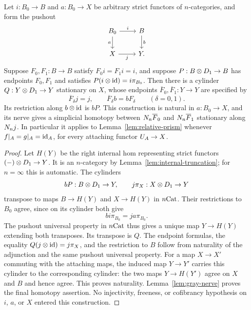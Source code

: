 \begin{lemma}\label{lem:pushout-cylinder}
Let $i:B_0\to B$ and $a:B_0\to X$ be arbitrary strict functors of
$n$-categories, and form the pushout
\[
 \begin{tikzcd}
 B_0\ar[r,"i"]\ar[d,"a"']&B\ar[d,"b"]\\
 X\ar[r,"j"']&Y.
 \end{tikzcd}
\]
Suppose $F_0,F_1:B\to B$ satisfy $F_0i=F_1i=i$, and suppose
$P:B\otimes D_{1}\to B$ has endpoints $F_0,F_1$ and satisfies
$P(i\otimes\mathrm{id})=i\pi_{B_0}$.
Then there is a cylinder $Q:Y\otimes D_{1}\to Y$ stationary on $X$,
whose endpoints $\overline F_0,\overline F_1:Y\to Y$ are specified by
\[
 \overline F_\delta j=j,\qquad
 \overline F_\delta b=bF_\delta\qquad(\delta=0,1).
\]
Its restriction along $b\otimes\mathrm{id}$ is $bP$.
This construction is natural in $a:B_0\to X$, and its nerve gives a
simplicial homotopy between $N_n\overline F_0$ and
$N_n\overline F_1$ stationary along $N_n j$.
In particular it applies to Lemma~\ref{lem:relative-prism} whenever
$f|_A=g|_A=\mathrm{id}_A$, for every attaching functor $U_{A}\to X$.
\end{lemma}

\begin{proof}
Let $H(Y)$ be the right internal hom representing strict functors
$(-)\otimes D_{1}\to Y$.
It is an $n$-category by Lemma~\ref{lem:internal-truncation}; for
$n=\infty$ this is automatic.
The cylinders
\[
 bP:B\otimes D_{1}\to Y,
 \qquad j\pi_X:X\otimes D_{1}\to Y
\]
transpose to maps $B\to H(Y)$ and $X\to H(Y)$ in $n\mathrm{Cat}$.
Their restrictions to $B_0$ agree, since on its cylinder both give
\[
 bi\pi_{B_0}=ja\pi_{B_0}.
\]
The pushout universal property in $n\mathrm{Cat}$ thus gives a unique map
$Y\to H(Y)$ extending both transposes.  Its transpose is $Q$.
The endpoint formulas, the equality
$Q(j\otimes\mathrm{id})=j\pi_X$, and the restriction to $B$ follow from
naturality of the adjunction and the same pushout universal property.
For a map $X\to X'$ commuting with the attaching maps, the induced
map $Y\to Y'$ carries this cylinder to the corresponding cylinder:
the two maps $Y\to H(Y')$ agree on $X$ and $B$ and hence agree.
This proves naturality.  Lemma~\ref{lem:gray-nerve} proves the final
homotopy assertion.
No injectivity, freeness, or cofibrancy hypothesis on $i$, $a$, or $X$
entered this construction.
\end{proof}
